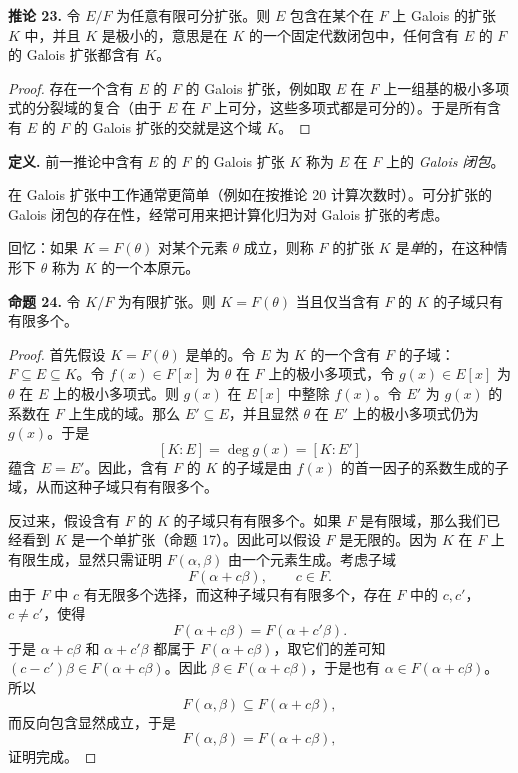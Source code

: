 \noindent\textbf{推论 23.} 令 $E/F$ 为任意有限可分扩张。则 $E$ 包含在某个在 $F$ 上 Galois 的扩张 $K$ 中，并且 $K$ 是极小的，意思是在 $K$ 的一个固定代数闭包中，任何含有 $E$ 的 $F$ 的 Galois 扩张都含有 $K$。

\begin{proof}
存在一个含有 $E$ 的 $F$ 的 Galois 扩张，例如取 $E$ 在 $F$ 上一组基的极小多项式的分裂域的复合（由于 $E$ 在 $F$ 上可分，这些多项式都是可分的）。于是所有含有 $E$ 的 $F$ 的 Galois 扩张的交就是这个域 $K$。
\end{proof}

\noindent\textbf{定义.} 前一推论中含有 $E$ 的 $F$ 的 Galois 扩张 $K$ 称为 $E$ 在 $F$ 上的 \emph{Galois 闭包}。

在 Galois 扩张中工作通常更简单（例如在按推论 20 计算次数时）。可分扩张的 Galois 闭包的存在性，经常可用来把计算化归为对 Galois 扩张的考虑。

回忆：如果 $K=F(\theta)$ 对某个元素 $\theta$ 成立，则称 $F$ 的扩张 $K$ 是\emph{单}的，在这种情形下 $\theta$ 称为 $K$ 的一个本原元。

\noindent\textbf{命题 24.} 令 $K/F$ 为有限扩张。则 $K=F(\theta)$ 当且仅当含有 $F$ 的 $K$ 的子域只有有限多个。

\begin{proof}
首先假设 $K=F(\theta)$ 是单的。令 $E$ 为 $K$ 的一个含有 $F$ 的子域：$F\subseteq E\subseteq K$。令 $f(x)\in F[x]$ 为 $\theta$ 在 $F$ 上的极小多项式，令 $g(x)\in E[x]$ 为 $\theta$ 在 $E$ 上的极小多项式。则 $g(x)$ 在 $E[x]$ 中整除 $f(x)$。令 $E'$ 为 $g(x)$ 的系数在 $F$ 上生成的域。那么 $E'\subseteq E$，并且显然 $\theta$ 在 $E'$ 上的极小多项式仍为 $g(x)$。于是
\[
[K:E]=\deg g(x)=[K:E']
\]
蕴含 $E=E'$。因此，含有 $F$ 的 $K$ 的子域是由 $f(x)$ 的首一因子的系数生成的子域，从而这种子域只有有限多个。

反过来，假设含有 $F$ 的 $K$ 的子域只有有限多个。如果 $F$ 是有限域，那么我们已经看到 $K$ 是一个单扩张（命题 17）。因此可以假设 $F$ 是无限的。因为 $K$ 在 $F$ 上有限生成，显然只需证明 $F(\alpha,\beta)$ 由一个元素生成。考虑子域
\[
F(\alpha+c\beta),\qquad c\in F.
\]
由于 $F$ 中 $c$ 有无限多个选择，而这种子域只有有限多个，存在 $F$ 中的 $c,c'$，$c\neq c'$，使得
\[
F(\alpha+c\beta)=F(\alpha+c'\beta).
\]
于是 $\alpha+c\beta$ 和 $\alpha+c'\beta$ 都属于 $F(\alpha+c\beta)$，取它们的差可知 $(c-c')\beta\in F(\alpha+c\beta)$。因此 $\beta\in F(\alpha+c\beta)$，于是也有 $\alpha\in F(\alpha+c\beta)$。所以
\[
F(\alpha,\beta)\subseteq F(\alpha+c\beta),
\]
而反向包含显然成立，于是
\[
F(\alpha,\beta)=F(\alpha+c\beta),
\]
证明完成。
\end{proof}

